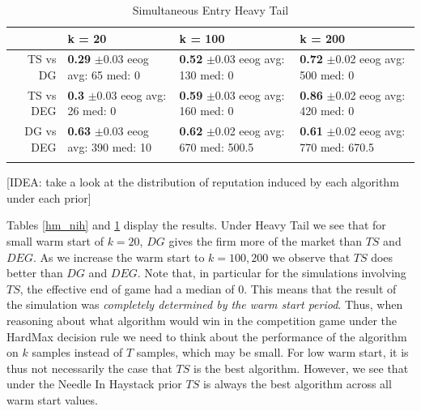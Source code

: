 \documentclass{article}
\theoremstyle{definition}
\begin{document}
\begin{table}[ht]
\centering
\caption{Simultaneous Entry Heavy Tail} 
\begin{tabular}{rlll}
  \hline
 & k = 20 & k = 100 & k = 200 \\ 
  \hline
TS vs DG & \makecell{\textbf{0.29} $\pm$0.03\\ eeog \\ avg: 65\\ med: 0} & \makecell{\textbf{0.52} $\pm$0.03\\ eeog \\ avg: 130\\ med: 0} & \makecell{\textbf{0.72} $\pm$0.02\\ eeog \\ avg: 500\\ med: 0} \\ 
  TS vs DEG & \makecell{\textbf{0.3} $\pm$0.03\\ eeog \\ avg: 26\\ med: 0} & \makecell{\textbf{0.59} $\pm$0.03\\ eeog \\ avg: 160\\ med: 0} & \makecell{\textbf{0.86} $\pm$0.02\\ eeog \\ avg: 420\\ med: 0} \\ 
  DG vs DEG & \makecell{\textbf{0.63} $\pm$0.03\\ eeog \\ avg: 390\\ med: 10} & \makecell{\textbf{0.62} $\pm$0.02\\ eeog \\ avg: 670\\ med: 500.5} & \makecell{\textbf{0.61} $\pm$0.02\\ eeog \\ avg: 770\\ med: 670.5} \\ 
   \hline
   \label{hm_ht}
\end{tabular}
\end{table}

[IDEA: take a look at the distribution of reputation induced by each algorithm under each prior]

Tables \ref{hm_nih} and \ref{hm_ht} display the results. Under Heavy Tail we see that for small warm start of $k = 20$, $DG$ gives the firm more of the market than $TS$ and $DEG$. As we increase the warm start to $k = 100, 200$ we observe that $TS$ does better than $DG$ and $DEG$. Note that, in particular for the simulations involving $TS$, the effective end of game had a median of 0. This means that the result of the simulation was \textit{completely determined by the warm start period}. Thus, when reasoning about what algorithm would win in the competition game under the HardMax decision rule we need to think about the performance of the algorithm on $k$ samples instead of $T$ samples, which may be small. For low warm start, it is thus not necessarily the case that $TS$ is the best algorithm. However, we see that under the Needle In Haystack prior $TS$ is always the best algorithm across all warm start values.
\end{document}

